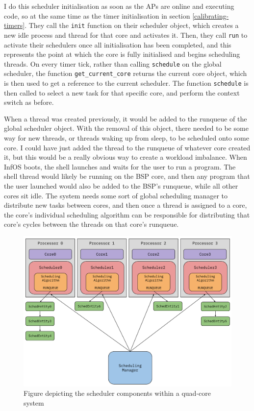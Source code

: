 \documentclass[bsc,frontabs,singlespacing,parskip,deptreport]{infthesis}
\begin{document}
I do this scheduler initialisation as soon as the APs are online and executing code, so at the same time as the timer initialisation in section \ref{calibrating-timers}. They call the \verb|init| function on their scheduler object, which creates a new idle process and thread for that core and activates it. Then, they call \verb|run| to activate their schedulers once all initialisation has been completed, and this represents the point at which the core is fully initialised and begins scheduling threads. On every timer tick, rather than calling \verb|schedule| on the global scheduler, the function \verb|get_current_core| returns the current core object, which is then used to get a reference to the current scheduler. The function \verb|schedule| is then called to select a new task for that specific core, and perform the context switch as before.

When a thread was created previously, it would be added to the runqueue of the global scheduler object. With the removal of this object, there needed to be some way for new threads, or threads waking up from sleep, to be scheduled onto some core. I could have just added the thread to the runqueue of whatever core created it, but this would be a really obvious way to create a workload imbalance. When InfOS boots, the shell launches and waits for the user to run a program. The shell thread would likely be running on the BSP core, and then any program that the user launched would also be added to the BSP's runqueue, while all other cores sit idle. The system needs some sort of global scheduling manager to distribute new tasks between cores, and then once a thread is assigned to a core, the core's individual scheduling algorithm can be responsible for distributing that core's cycles between the threads on that core's runqueue.

\begin{figure}[h]
    \centering
    \includegraphics[scale=0.5]{figures/multicore-schedulers.pdf}
    \caption{Figure depicting the scheduler components within a quad-core system}
    \label{multicore-schedulers}
\end{figure}
\end{document}
